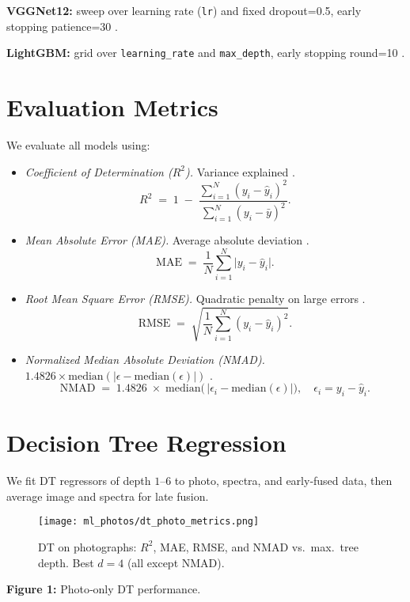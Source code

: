 \documentclass[english,bachelor,oneside]{ctufit-thesis}
\begin{document}
\textbf{VGGNet12:} sweep over learning rate (\texttt{lr}) and fixed dropout=0.5, early stopping patience=30 \cite{Smith2017,Prechelt1998}.  

\textbf{LightGBM:} grid over \texttt{learning\_rate} and \texttt{max\_depth}, early stopping round=10 \cite{Friedman2001}.

\section{Evaluation Metrics}
We evaluate all models using:
\begin{itemize}
  \item \textit{Coefficient of Determination ($R^2$).} Variance explained \cite{Hastie2009}.\\
  \[
    R^2 \;=\; 1 \;-\; \frac{\sum_{i=1}^N (y_i - \hat y_i)^2}{\sum_{i=1}^N (y_i - \bar y)^2}.
  \]
  \item \textit{Mean Absolute Error (MAE).} Average absolute deviation \cite{Hastie2009}.\\
  \[
    \mathrm{MAE} \;=\; \frac{1}{N} \sum_{i=1}^N \bigl|y_i - \hat y_i\bigr|.
  \]
  \item \textit{Root Mean Square Error (RMSE).} Quadratic penalty on large errors \cite{Hastie2009}.\\
  \[
    \mathrm{RMSE} \;=\; \sqrt{\frac{1}{N} \sum_{i=1}^N (y_i - \hat y_i)^2}.
  \]
  \item \textit{Normalized Median Absolute Deviation (NMAD).} $1.4826\times\mathrm{median}(|\epsilon-\mathrm{median}(\epsilon)|)$ \cite{Rousseeuw1993}.\\
  \[
    \mathrm{NMAD} \;=\; 1.4826 \;\times\; \mathrm{median}\!\bigl(\,\lvert \epsilon_i - \mathrm{median}(\epsilon)\rvert\bigr),
    \quad \epsilon_i = y_i - \hat y_i.
  \]
\end{itemize}

\section{Decision Tree Regression}
We fit DT regressors of depth $1$--$6$ to photo, spectra, and early‐fused data, then average image and spectra for late fusion.

\begin{figure}[H]
  \centering
  \texttt{[image: ml\_photos/dt\_photo\_metrics.png]}
  \caption{DT on photographs: $R^2$, MAE, RMSE, and NMAD vs.\ max.\ tree depth. Best $d=4$ (all except NMAD).}
  \label{fig:dt_photo_metrics}
\end{figure}
\noindent\textbf{Figure 1:} Photo‐only DT performance.\\
\end{document}
